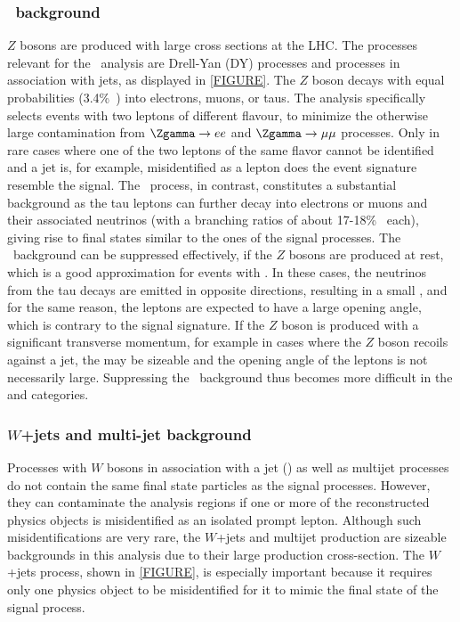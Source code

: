 \subsubsection{\Ztautau\ background}
$Z$ bosons are produced with large cross sections at the LHC. The processes relevant for the \HWW\ analysis are Drell-Yan (DY) processes and \Zgamma processes in association with jets, as displayed in \cref{FIGURE}. 
The $Z$ boson decays with equal probabilities (3.4\%~\cite{PDG2020}) into electrons, muons, or taus. 
The analysis specifically selects events with two leptons of different flavour, to minimize the otherwise large contamination from $\Zgamma \to ee$ and $\Zgamma \to \mu\mu$ processes. Only in rare cases where one of the two leptons of the same flavor cannot be identified and a jet is, for example, misidentified as a lepton does the event signature resemble the signal. 
The \Ztautau\ process, in contrast, constitutes a substantial background as the tau leptons can further decay into electrons or muons and their associated neutrinos (with a branching ratios of about 17-18\%~\cite{PDG2020} each), giving rise to final states similar to the ones of the signal processes. 
The \Ztautau\ background can be suppressed effectively, if the $Z$ bosons are produced at rest, which is a good approximation for events with \ZeroJet. In these cases, the neutrinos from the tau decays are emitted in opposite directions, resulting in a small \MET, and for the same reason, the leptons are expected to have a large opening angle, which is contrary to the signal signature. 
If the $Z$ boson is produced with a significant transverse momentum, for example in cases where the $Z$ boson recoils against a jet, the \MET may be sizeable and the opening angle of the leptons is not necessarily large. 
Suppressing the \Ztautau\ background thus becomes more difficult in the \OneJet and \TwoJet categories. 


\subsubsection{$W$+jets and multi-jet background}
Processes with $W$ bosons in association with a jet (\Wjets) as well as multijet processes do not contain the same final state particles as the signal processes. However, they can contaminate the analysis regions if one or more of the reconstructed physics objects is misidentified as an isolated prompt lepton. 
Although such misidentifications are very rare, the $W$+jets and multijet production are sizeable backgrounds in this analysis due to their large production cross-section.
The $W$+jets process, shown in \cref{FIGURE}, is especially important because it requires only one physics object to be misidentified for it to mimic the final state of the signal process.

